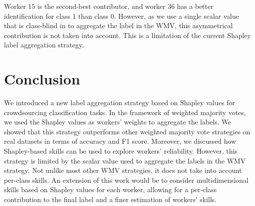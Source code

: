 \documentclass{cap2024}
\begin{document}
Worker $15$ is the second-best contributor, and worker $36$ has a better identification for class $1$ than class $0$.
However, as we use a single scalar value that is class-blind in  to aggregate the label in the WMV, this asymmetrical contribution is not taken into account.
This is a limitation of the current Shapley label aggregation strategy.


\section{Conclusion}
\label{sec:conclusion}

We introduced a new label aggregation strategy based on Shapley values for crowdsourcing classification tasks.
In the framework of weighted majority votes, we used the Shapley values as workers' weights to aggregate the labels.
We showed that this strategy outperforms other weighted majority vote strategies on real datasets in terms of accuracy and F1 score.
Moreover, we discussed how Shapley-based skills can be used to explore workers' reliability.
However, this strategy is limited by the scalar value used to aggregate the labels in the WMV strategy.
Not unlike most other WMV strategies, it does not take into account per-class skills.
An extension of this work would be to consider multidimensional skills based on Shapley values for each worker, allowing for a per-class contribution to the final label and a finer estimation of workers' skills.



\end{document}
